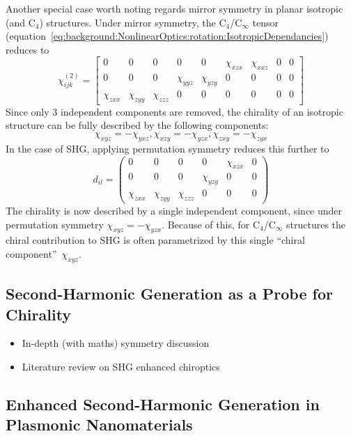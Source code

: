 Another special case worth noting regards mirror symmetry in planar isotropic (and C$_4$) structures. Under mirror symmetry, the C$_4$/C$_\infty$ tensor (equation~\ref{eq:background:NonlinearOptics:rotation:IsotropicDependancies}) reduces to
\begin{equation}\label{eq:background:NonlinearOptics:mirror:IsotropicMirrorChi}
	\chi^{(2)}_{ijk} =
	\begin{bmatrix}
		0 & 0 & 0 & 0 & 0 & \chi_{xzx} & \chi_{xxz} & 0 & 0\\ 
		0 & 0 & 0 & \chi_{yyz} & \chi_{yzy} & 0 & 0 & 0 & 0\\ 
		\chi_{zxx} & \chi_{zyy} & \chi_{zzz} & 0 & 0 & 0 & 0 & 0 & 0
	\end{bmatrix}
\end{equation}
Since only 3 independent components are removed, the chirality of an isotropic structure can be fully described by the following components:
\begin{equation}\label{eq:background:NonlinearOptics:mirror:IsoChiralComponents}
\chi_{xyz} = -\chi_{yxz}, \chi_{xzy} = -\chi_{yzx}, \chi_{zxy} = -\chi_{zyx} 
\end{equation}
In the case of SHG, applying permutation symmetry reduces this further to
\begin{equation}\label{eq:background:NonlinearOptics:mirror:ReducedIsoChiral}
	d_{il} = 
	\begin{pmatrix}
		0 & 0 & 0 & 0 & \chi_{xzx} & 0\\ 
		0 & 0 & 0 & \chi_{yzy} & 0 & 0\\ 
		\chi_{zxx} & \chi_{zyy} & \chi_{zzz} & 0 & 0 & 0
	\end{pmatrix} 
\end{equation}
The chirality is now described by a single independent component, since under permutation symmetry $\chi_{xyz} = -\chi_{yzx}$. Because of this, for C$_4$/C$_\infty$ structures the chiral contribution to SHG is often parametrized by this single ``chiral component''~$\chi_{xyz}$.

\subsection{Second-Harmonic Generation as a Probe for Chirality}\label{sec:background:NonlinearOptics:chirality}
\begin{itemize}
    \item In-depth (with maths) symmetry discussion
    \item Literature review on SHG enhanced chiroptics
\end{itemize}


\subsection{Enhanced Second-Harmonic Generation in Plasmonic Nanomaterials}\label{sec:background:NonlinearOptics:plasmonic}